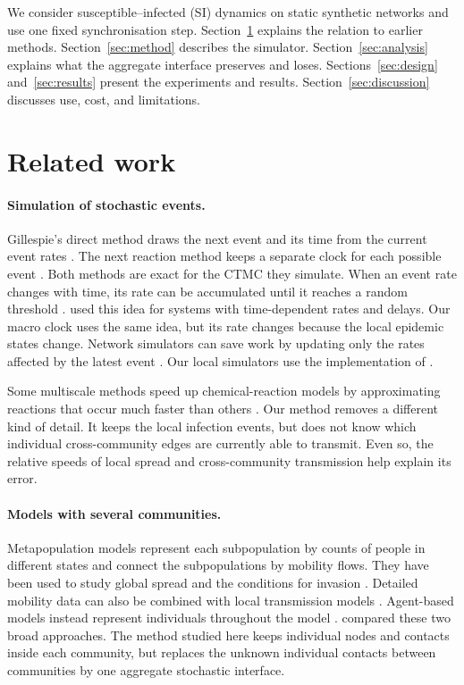 \documentclass[a4paper,fleqn]{cas-sc}
\begin{document}
We consider susceptible--infected (SI) dynamics on static synthetic networks and use one fixed synchronisation step. Section~\ref{sec:related} explains the relation to earlier methods. Section~\ref{sec:method} describes the simulator. Section~\ref{sec:analysis} explains what the aggregate interface preserves and loses. Sections~\ref{sec:design} and~\ref{sec:results} present the experiments and results. Section~\ref{sec:discussion} discusses use, cost, and limitations.


\section{Related work}
\label{sec:related}

\paragraph{Simulation of stochastic events.}
Gillespie's direct method draws the next event and its time from the current event rates \citep{gillespie1977exact}. The next reaction method keeps a separate clock for each possible event \citep{gibson2000}. Both methods are exact for the CTMC they simulate. When an event rate changes with time, its rate can be accumulated until it reaches a random threshold \citep{ethier1986}. \citet{anderson2007} used this idea for systems with time-dependent rates and delays. Our macro clock uses the same idea, but its rate changes because the local epidemic states change. Network simulators can save work by updating only the rates affected by the latest event \citep{vestergaard2015,kuryliak2025simulating}. Our local simulators use the implementation of \citet{kuryliak2025simulating}.

Some multiscale methods speed up chemical-reaction models by approximating reactions that occur much faster than others \citep{haseltine2002,cao2005slow}. Our method removes a different kind of detail. It keeps the local infection events, but does not know which individual cross-community edges are currently able to transmit. Even so, the relative speeds of local spread and cross-community transmission help explain its error.

\paragraph{Models with several communities.}
Metapopulation models represent each subpopulation by counts of people in different states and connect the subpopulations by mobility flows. They have been used to study global spread and the conditions for invasion \citep{colizza2007reaction,colizza2008,balcan2009,balcan2010modeling}. Detailed mobility data can also be combined with local transmission models \citep{chang2021}. Agent-based models instead represent individuals throughout the model \citep{eubank2004,kerr2021}. \citet{ajelli2010} compared these two broad approaches. The method studied here keeps individual nodes and contacts inside each community, but replaces the unknown individual contacts between communities by one aggregate stochastic interface.
\end{document}
